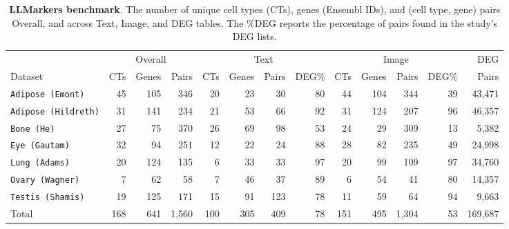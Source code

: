 \documentclass[10pt,twocolumn]{article}
\theoremstyle{plain}
\theoremstyle{definition}
\theoremstyle{remark}
\begin{document}
\begin{table}[ht!]
  \centering
  \caption{\textbf{LLMarkers benchmark}. The number of unique cell types (CTs), genes (Ensembl IDs), and (cell type, gene) pairs Overall, and across Text, Image, and DEG tables. The \%DEG reports the percentage of pairs found in the study's DEG lists.}
  \label{tab:benchmark}%
  \small
  \begin{tabular}{@{}l rrr rrrr rrrr r@{}}
  \toprule
   & \multicolumn{3}{c}{Overall} & \multicolumn{4}{c}{Text} & \multicolumn{4}{c}{Image} & DEG \\
  \cmidrule(lr){2-4} \cmidrule(lr){5-8} \cmidrule(lr){9-12} \cmidrule(lr){13-13}
  Dataset & CTs & Genes & Pairs & CTs & Genes & Pairs & DEG\% & CTs & Genes & Pairs & DEG\% & Pairs \\
  \midrule
  \texttt{Adipose (Emont)}    &  45 & 105 &   346 &  20 &  23 &   30 &  80 &  44 & 104 &  344 &  39 & 43{,}471 \\
  \texttt{Adipose (Hildreth)} &  31 & 141 &   234 &  21 &  53 &   66 &  92 &  31 & 124 &  207 &  96 & 46{,}357 \\
  \texttt{Bone (He)}          &  27 &  75 &   370 &  26 &  69 &   98 &  53 &  24 &  29 &  309 &  13 &  5{,}382 \\
  \texttt{Eye (Gautam)}       &  32 &  94 &   251 &  12 &  22 &   24 &  88 &  28 &  82 &  235 &  49 & 24{,}998 \\
  \texttt{Lung (Adams)}       &  20 & 124 &   135 &   6 &  33 &   33 &  97 &  20 &  99 &  109 &  97 & 34{,}760 \\
  \texttt{Ovary (Wagner)}     &   7 &  62 &    58 &   7 &  46 &   37 &  89 &   6 &  54 &   41 &  80 & 14{,}357 \\
  \texttt{Testis (Shamis)}    &  19 & 125 &   171 &  15 &  91 &  123 &  78 &  11 &  59 &   64 &  94 &  9{,}663 \\
  \midrule
  Total              & 168 & 641 & 1{,}560 & 100 & 305 &  409 &  78 & 151 & 495 & 1{,}304 &  53 & 169{,}687 \\
  \bottomrule
  \end{tabular}
\end{table}


\end{document}
